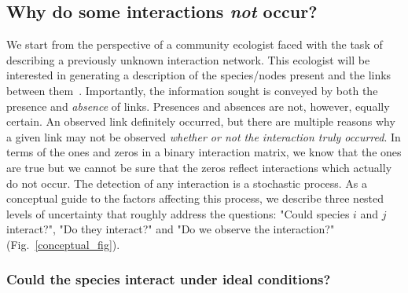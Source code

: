 \documentclass[12pt]{article}
\begin{document}
\begin{spacing}{2.0}


    \subsection*{Why do some interactions \emph{not} occur?}

      We start from the perspective of a community ecologist faced with the task of describing a previously unknown interaction network. This ecologist will be interested in generating a description of the species/nodes present and the links between them~\citep{Roslin2016}.  Importantly, the information sought is conveyed by both the presence and \emph{absence} of links. Presences and absences are not, however, equally certain. An observed link definitely occurred, but there are multiple reasons why a given link may not be observed \emph{whether or not the interaction truly occurred}. In terms of the ones and zeros in a binary interaction matrix, we know that the ones are true but we cannot be sure that the zeros reflect interactions which actually do not occur. The detection of any interaction is a stochastic process. As a conceptual guide to the factors affecting this process, we describe three nested levels of uncertainty that roughly address the questions: "Could species $i$ and $j$ interact?", "Do they interact?" and "Do we observe the interaction?" (Fig.~\ref{conceptual_fig}).


        \subsubsection*{Could the species interact under ideal conditions?} 


\end{spacing}
\end{document}
